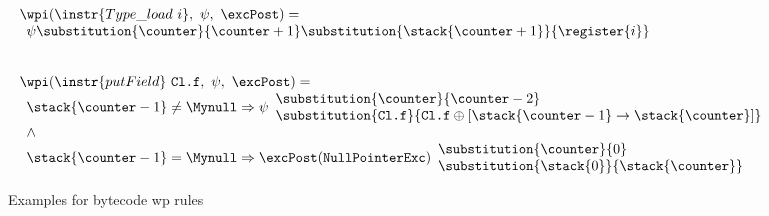 
\begin{figure}[htp]
\[
\begin{array}{l}
\wpi(\instr{Type\_load \ i}, \ \psi, \ \excPost)  = \\
\begin{array}{l}  \psi\substitution{\counter }{\counter+1} \substitution{\stack{\counter+1}}{\register{i}} \end{array} \\
\\
\\
 \wpi(\instr{putField} \ \texttt{Cl.f}, \ \psi, \ \excPost)  = \\
\begin{array}{l}
                \stack{\counter -1} \not= \Mynull\Rightarrow   
         \psi\begin{array}{l} \substitution{\counter}{ \counter-2 } \\[0 mm] 
                           \substitution{\texttt{Cl.f} }{ \texttt{Cl.f}\oplus [\stack{\counter -1} \rightarrow \stack{\counter}] } \\
                \end{array}\\

   \wedge \\
        \stack{\counter-1} = \Mynull    \Rightarrow \excPost(\tt{NullPointerExc})
        \begin{array}{l}
          \substitution{ \counter }{ 0} \\
          \substitution{\stack{0}}{ \stack{\counter}} 
        \end{array}
    \end{array} %
\end{array}
 \]       
\caption{\sc Examples for bytecode wp rules}
 \label{instrWP}

\end{figure}


